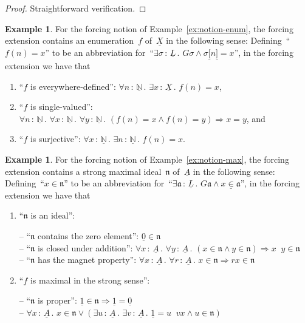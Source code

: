 \documentclass[com,11pt,crcready]{iosart2x}
\theoremstyle{definition}
\newtheorem{example}[definition]{Example}
\theoremstyle{plain}
\theoremstyle{remark}
\newcommand{\?}{\,{:}\,}
\newcommand{\aaa}{\mathfrak{a}}
\newcommand{\nnn}{\mathfrak{n}}
\newcommand{\NN}{\mathbb{N}}
\renewcommand{\_}{\mathpunct{.}\,}
\begin{document}
\begin{proof}Straightforward verification.
\end{proof}

\begin{example}For the forcing notion of Example~\ref{ex:notion-enum}, the
forcing extension contains an enumeration~$f$ of~$\underline{X}$ in the following
sense: Defining~``$f(n) = x$'' to be an abbreviation for~``$\exists
\sigma\?\underline{L}\_ G\sigma \wedge \sigma\underline{[}n\underline{]} =
x$'', in the forcing extension we have that
\begin{enumerate}
\item ``$f$ is everywhere-defined'': $\forall n\?\underline{\NN}\_ \exists
x\?\underline{X}\_ f(n) = x$,
\item ``$f$ is single-valued'': $\forall n\?\underline{\NN}\_ \forall
x\?\underline{\NN}\_ \forall y\?\underline{\NN}\_
(f(n) = x \wedge f(n) = y) \Rightarrow x = y$, and
\item ``$f$ is surjective'': $\forall x\?\underline{\NN}\_ \exists n\?\underline{\NN}\_
f(n) = x$.
\end{enumerate}
\end{example}

\begin{example}For the forcing notion of Example~\ref{ex:notion-max}, the
forcing extension contains a strong maximal ideal~$\nnn$ of~$\underline{A}$ in the following
sense: Defining~``$x \in \nnn$'' to be an abbreviation for~``$\exists
\aaa\?\underline{L}\_ G\aaa \wedge x \mathrel{\underline{\in}} \aaa$'',
in the forcing extension we have that
\begin{enumerate}
\item ``$\nnn$ is an ideal'':

-- ``$\nnn$ contains the zero element'': $\underline{0} \in \nnn$ \\
-- ``$\nnn$ is closed under addition'': $\forall x\?\underline{A}\_ \forall y\?\underline{A}\_ (x \in \nnn \wedge y \in
\nnn) \Rightarrow x\mathop{\underline{+}}y \in \nnn$ \\
-- ``$\nnn$ has the magnet property'': $\forall x\?\underline{A}\_ \forall
r\?\underline{A}\_ x \in \nnn \Rightarrow rx \in \nnn$

\item ``$f$ is maximal in the strong sense'':

-- ``$\nnn$ is proper'': $\underline{1} \in \nnn \Rightarrow \underline{1} =
\underline{0}$ \\
-- $\forall x\?\underline{A}\_ x \in \nnn \vee (\exists u\?\underline{A}\_
\exists v\?\underline{A}\_ \underline{1} = u \mathop{\underline{+}} vx \wedge u
\in \nnn)$
\end{enumerate}
\end{example}
\end{document}
